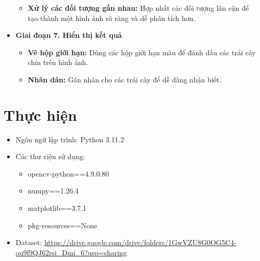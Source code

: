 \documentclass[a4paper]{article}
\begin{document}
\begin{itemize}[label={}]
\begin{itemize}[label={}]
        \item \textbf{Xử lý các đối tượng gần nhau:} Hợp nhất các đối tượng lân cận để tạo thành một hình ảnh rõ ràng và dễ phân tích hơn.
    \end{itemize}
    \item \textbf{Giai đoạn 7. Hiển thị kết quả}
    \begin{itemize}[label={}]
        \item \textbf{Vẽ hộp giới hạn:} Dùng các hộp giới hạn màu để đánh dấu các trái cây chín trên hình ảnh.
        \item \textbf{Nhãn dán:} Gán nhãn cho các trái cây để dễ dàng nhận biết.
    \end{itemize}
\end{itemize}
\newpage
\section{Thực hiện}
\begin{itemize}[label={}]
    \item Ngôn ngữ lập trình: Python 3.11.2
    \item Các thư viện sử dụng:
    \begin{itemize}[label={}]
        \item opencv-python==4.9.0.80
        \item numpy==1.26.4
        \item matplotlib==3.7.1
        \item pkg-resources==None
    \end{itemize}
    \item Dataset: \url{https://drive.google.com/drive/folders/1GwVZU8G0OG5C4-ou9f9QJ62rsi_Dmi_6?usp=sharing}
\end{itemize}
\end{document}
